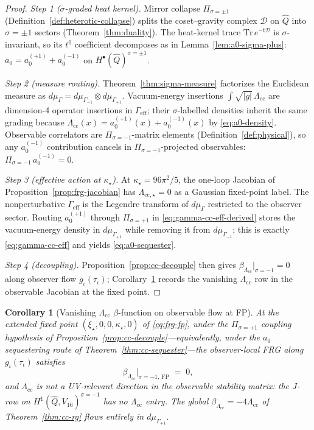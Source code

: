 \documentclass[11pt]{article}
\theoremstyle{plain}
\newtheorem{corollary}[theorem]{Corollary}
\theoremstyle{definition}
\theoremstyle{remark}
\numberwithin{equation}{section}
\begin{document}
\begin{proof}
\emph{Step 1 ($\sigma$-graded heat kernel).}
Mirror collapse $\Pi_{\sigma=\pm1}$
(Definition~\ref{def:heterotic-collapse}) splits the coset--gravity complex
$\mathcal{D}$ on $\hat Q$ into $\sigma=\pm1$ sectors
(Theorem~\ref{thm:duality}). The heat-kernel trace
$\mathrm{Tr}\,e^{-t\mathcal{D}}$ is $\sigma$-invariant, so its $t^0$
coefficient decomposes as in Lemma~\ref{lem:a0-sigma-plus}:
$a_0=a_0^{(+1)}+a_0^{(-1)}$ on
$H^\bullet(\hat Q)^{\sigma=\pm1}$.

\emph{Step 2 (measure routing).}
Theorem~\ref{thm:sigma-measure} factorizes the Euclidean measure as
$d\mu_\Gamma=d\mu_{\Gamma_{-1}}\otimes d\mu_{\Gamma_{+1}}$.
Vacuum-energy insertions $\int\sqrt{|g|}\,\Lambda_{\mathrm{cc}}$ are
dimension-4 operator insertions in $\Gamma_{\mathrm{eff}}$; their
$\sigma$-labelled densities inherit the same grading because
$\Lambda_{\mathrm{cc}}(x)=a_0^{(+1)}(x)+a_0^{(-1)}(x)$ by
\eqref{eq:a0-density}. Observable correlators are $\Pi_{\sigma=-1}$-matrix
elements (Definition~\ref{def:physical}), so any $a_0^{(-1)}$ contribution
cancels in $\Pi_{\sigma=-1}$-projected observables:
$\Pi_{\sigma=-1}\,a_0^{(-1)}=0$.

\emph{Step 3 (effective action at $\kappa_\star$).}
At $\kappa_\star=96\pi^2/5$, the one-loop Jacobian of
Proposition~\ref{prop:frg-jacobian} has
$\Lambda_{\mathrm{cc},\star}=0$ as a Gaussian fixed-point label. The
nonperturbative $\Gamma_{\mathrm{eff}}$ is the Legendre transform of
$d\mu_\Gamma$ restricted to the observer sector. Routing
$a_0^{(+1)}$ through $\Pi_{\sigma=+1}$ in \eqref{eq:gamma-cc-eff-derived}
stores the vacuum-energy density in $d\mu_{\Gamma_{+1}}$ while removing it
from $d\mu_{\Gamma_{-1}}$; this is exactly \eqref{eq:gamma-cc-eff} and
yields \eqref{eq:a0-sequester}.

\emph{Step 4 (decoupling).}
Proposition~\ref{prop:cc-decouple} then gives
$\beta_{\Lambda_{\mathrm{cc}}}|_{\sigma=-1}=0$ along observer flow
$g_\iota(\tau_\iota)$; Corollary~\ref{cor:beta-Lambda-fp} records the
vanishing $\Lambda_{\mathrm{cc}}$ row in the observable Jacobian at the
fixed point.
\end{proof}

\begin{corollary}[Vanishing $\Lambda_{\mathrm{cc}}$ $\beta$-function on observable flow at FP]
\label{cor:beta-Lambda-fp}
At the extended fixed point $(\xi_\star,0,0,\kappa_\star,0)$ of
\eqref{eq:frg-fp}, under the $\Pi_{\sigma=+1}$ coupling hypothesis of
Proposition~\ref{prop:cc-decouple}---equivalently, under the $a_0$
sequestering route of Theorem~\ref{thm:cc-sequester}---the
observer-local FRG along $g_\iota(\tau_\iota)$ satisfies
\begin{equation}\label{eq:beta-Lambda-obs-fp}
  \beta_{\Lambda_{\mathrm{cc}}}\Big|_{\sigma=-1,\,\mathrm{FP}}
  \;=\;
  0,
\end{equation}
and $\Lambda_{\mathrm{cc}}$ is \emph{not} a UV-relevant direction in the
observable stability matrix: the $J$-row on
$H^1(\hat Q,V_{16})^{\sigma=-1}$ has no $\Lambda_{\mathrm{cc}}$ entry. The
global $\beta_{\Lambda_{\mathrm{cc}}}=-4\Lambda_{\mathrm{cc}}$ of
Theorem~\ref{thm:cc-rg} flows entirely in $d\mu_{\Gamma_{+1}}$.
\end{corollary}
\end{document}

